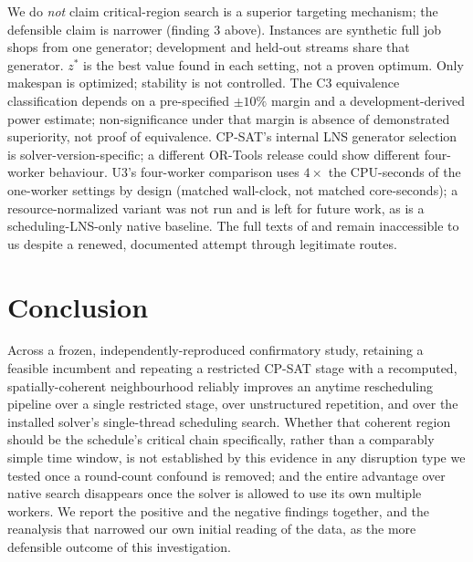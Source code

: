 \documentclass[letterpaper]{article} %
\begin{document}
We do \emph{not} claim critical-region search is a superior targeting mechanism; the defensible claim is narrower (finding 3 above). Instances are synthetic full job shops from one generator; development and held-out streams share that generator. $z^*$ is the best value found in each setting, not a proven optimum. Only makespan is optimized; stability is not controlled. The C3 equivalence classification depends on a pre-specified $\pm10\%$ margin and a development-derived power estimate; non-significance under that margin is absence of demonstrated superiority, not proof of equivalence. CP-SAT's internal LNS generator selection is solver-version-specific; a different OR-Tools release could show different four-worker behaviour. U3's four-worker comparison uses $4\times$ the CPU-seconds of the one-worker settings by design (matched wall-clock, not matched core-seconds); a resource-normalized variant was not run and is left for future work, as is a scheduling-LNS-only native baseline. The full texts of \citet{sun2026} and \citet{linyang2026} remain inaccessible to us despite a renewed, documented attempt through legitimate routes.

\section{Conclusion}

Across a frozen, independently-reproduced confirmatory study, retaining a feasible incumbent and repeating a restricted CP-SAT stage with a recomputed, spatially-coherent neighbourhood reliably improves an anytime rescheduling pipeline over a single restricted stage, over unstructured repetition, and over the installed solver's single-thread scheduling search. Whether that coherent region should be the schedule's critical chain specifically, rather than a comparably simple time window, is not established by this evidence in any disruption type we tested once a round-count confound is removed; and the entire advantage over native search disappears once the solver is allowed to use its own multiple workers. We report the positive and the negative findings together, and the reanalysis that narrowed our own initial reading of the data, as the more defensible outcome of this investigation.


\end{document}
